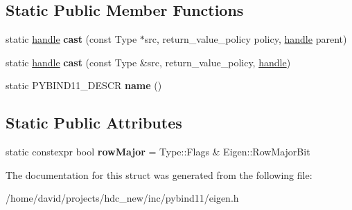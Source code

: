 \subsection*{Static Public Member Functions}
\begin{DoxyCompactItemize}
\item 
static \hyperlink{classhandle}{handle} {\bfseries cast} (const Type $\ast$src, return\+\_\+value\+\_\+policy policy, \hyperlink{classhandle}{handle} parent)\hypertarget{structtype__caster_3_01_type_00_01typename_01std_1_1enable__if_3_01is__eigen__dense_3_01_type_01_4_1_1value_01_4_1_1type_01_4_a9726cde8f86b3963281f4c5f1a2bc00a}{}\label{structtype__caster_3_01_type_00_01typename_01std_1_1enable__if_3_01is__eigen__dense_3_01_type_01_4_1_1value_01_4_1_1type_01_4_a9726cde8f86b3963281f4c5f1a2bc00a}

\item 
static \hyperlink{classhandle}{handle} {\bfseries cast} (const Type \&src, return\+\_\+value\+\_\+policy, \hyperlink{classhandle}{handle})\hypertarget{structtype__caster_3_01_type_00_01typename_01std_1_1enable__if_3_01is__eigen__dense_3_01_type_01_4_1_1value_01_4_1_1type_01_4_acf8952979fb6519ff6ce689ef5fadff5}{}\label{structtype__caster_3_01_type_00_01typename_01std_1_1enable__if_3_01is__eigen__dense_3_01_type_01_4_1_1value_01_4_1_1type_01_4_acf8952979fb6519ff6ce689ef5fadff5}

\item 
static P\+Y\+B\+I\+N\+D11\+\_\+\+D\+E\+S\+CR {\bfseries name} ()\hypertarget{structtype__caster_3_01_type_00_01typename_01std_1_1enable__if_3_01is__eigen__dense_3_01_type_01_4_1_1value_01_4_1_1type_01_4_ada30d3673d79fa3ea4c9208eafeb828d}{}\label{structtype__caster_3_01_type_00_01typename_01std_1_1enable__if_3_01is__eigen__dense_3_01_type_01_4_1_1value_01_4_1_1type_01_4_ada30d3673d79fa3ea4c9208eafeb828d}

\end{DoxyCompactItemize}
\subsection*{Static Public Attributes}
\begin{DoxyCompactItemize}
\item 
static constexpr bool {\bfseries row\+Major} = Type\+::\+Flags \& Eigen\+::\+Row\+Major\+Bit\hypertarget{structtype__caster_3_01_type_00_01typename_01std_1_1enable__if_3_01is__eigen__dense_3_01_type_01_4_1_1value_01_4_1_1type_01_4_a0d9c90f8860aeeb066f89dd892975dbf}{}\label{structtype__caster_3_01_type_00_01typename_01std_1_1enable__if_3_01is__eigen__dense_3_01_type_01_4_1_1value_01_4_1_1type_01_4_a0d9c90f8860aeeb066f89dd892975dbf}

\end{DoxyCompactItemize}


The documentation for this struct was generated from the following file\+:\begin{DoxyCompactItemize}
\item 
/home/david/projects/hdc\+\_\+new/inc/pybind11/eigen.\+h\end{DoxyCompactItemize}

